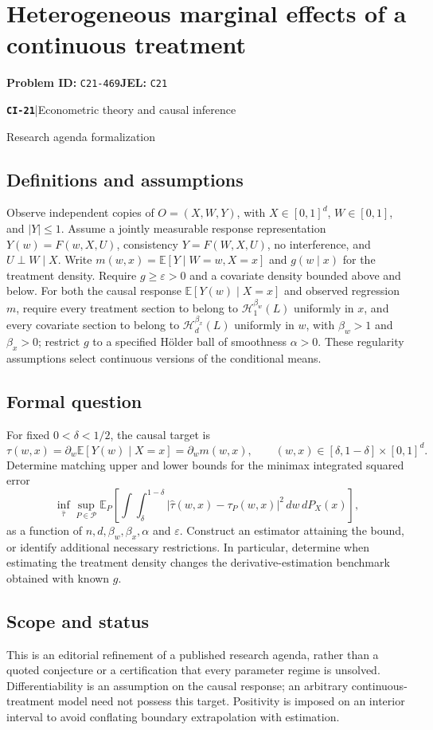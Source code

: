 \documentclass[11pt,a4paper]{article}
\newcommand{\E}{\mathbb E}
\newcommand{\entrymeta}[3]{{\sffamily\small\color{muted}\textbf{\texttt{#1}}\quad|\quad #2\par #3\par}}
\begin{document}
\section*{Heterogeneous marginal effects of a continuous treatment}
\textbf{Problem ID:} \texttt{C21-469}\quad \textbf{JEL:} \texttt{C21}\par
\label{problem:OP-0500}
\label{beyond:CI-21}
\entrymeta{CI-21}{Econometric theory and causal inference}{Research agenda formalization}
\subsection*{Definitions and assumptions}
Observe independent copies of $O=(X,W,Y)$, with $X\in[0,1]^d$, $W\in[0,1]$, and $|Y|\leq1$. Assume a jointly measurable response representation $Y(w)=F(w,X,U)$, consistency $Y=F(W,X,U)$, no interference, and $U\perp W\mid X$. Write $m(w,x)=\E[Y\mid W=w,X=x]$ and $g(w\mid x)$ for the treatment density. Require $g\geq\varepsilon>0$ and a covariate density bounded above and below. For both the causal response $\E[Y(w)\mid X=x]$ and observed regression $m$, require every treatment section to belong to $\mathcal H_1^{\beta_w}(L)$ uniformly in $x$, and every covariate section to belong to $\mathcal H_d^{\beta_x}(L)$ uniformly in $w$, with $\beta_w>1$ and $\beta_x>0$; restrict $g$ to a specified H\"older ball of smoothness $\alpha>0$. These regularity assumptions select continuous versions of the conditional means.
\subsection*{Formal question}
For fixed $0<\delta<1/2$, the causal target is
\[
 \tau(w,x)=\partial_w\E[Y(w)\mid X=x]=\partial_wm(w,x),\qquad
 (w,x)\in[\delta,1-\delta]\times[0,1]^d.
\]
Determine matching upper and lower bounds for the minimax integrated squared error
\[
 \inf_{\widehat\tau}\sup_{P\in\mathcal P}
 \E_P\!\left[\int\!\int_{\delta}^{1-\delta}
  |\widehat\tau(w,x)-\tau_P(w,x)|^2\,dw\,dP_X(x)\right],
\]
as a function of $n,d,\beta_w,\beta_x,\alpha$ and $\varepsilon$. Construct an estimator attaining the bound, or identify additional necessary restrictions. In particular, determine when estimating the treatment density changes the derivative-estimation benchmark obtained with known $g$.
\subsection*{Scope and status}
This is an editorial refinement of a published research agenda, rather than a quoted conjecture or a certification that every parameter regime is unsolved. Differentiability is an assumption on the causal response; an arbitrary continuous-treatment model need not possess this target. Positivity is imposed on an interior interval to avoid conflating boundary extrapolation with estimation.
\end{document}
